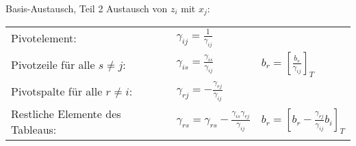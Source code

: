 \documentclass[accentcolor = tud11b, colorbacktitle, landscape, german, presentation, tudmathserif]{tudbeamer}
\begin{document}
			\begin{frame}{Basis-Austausch, Teil 2}
				\vspace{-0.3cm}
				Austausch von \( z_i \) mit \( x_j \):
				\begin{table}[H]
					\centering
					\begin{tabular}{lll}
						Pivotelement:                        & \( \gamma_{ij} = \frac{1}{\gamma_{ij}} \)                                     &                                                                      \\
						Pivotzeile für alle \( s \neq j \):  & \( \gamma_{is} = \frac{\gamma_{is}}{\gamma_{ij}} \)                           & \( b_r = \left[\frac{b_r}{\gamma_{ij}}\right]_T \)                   \\
						Pivotspalte für alle \( r \neq i \): & \( \gamma_{rj} = -\frac{\gamma_{rj}}{\gamma_{ij}} \)                          &                                                                      \\
						Restliche Elemente des Tableaus:     & \( \gamma_{rs} = \gamma_{rs} - \frac{\gamma_{is} \gamma_{rj}}{\gamma_{ij}} \) & \( b_r = \left[b_r - \frac{\gamma_{rj}}{\gamma_{ij}} b_i\right]_T \)
					\end{tabular}
				\end{table}
				

\end{frame}
\end{document}
